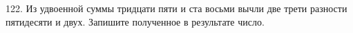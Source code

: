 122. Из удвоенной суммы тридцати пяти и ста восьми вычли две трети разности пятидесяти и двух. Запишите полученное в результате число.\\
